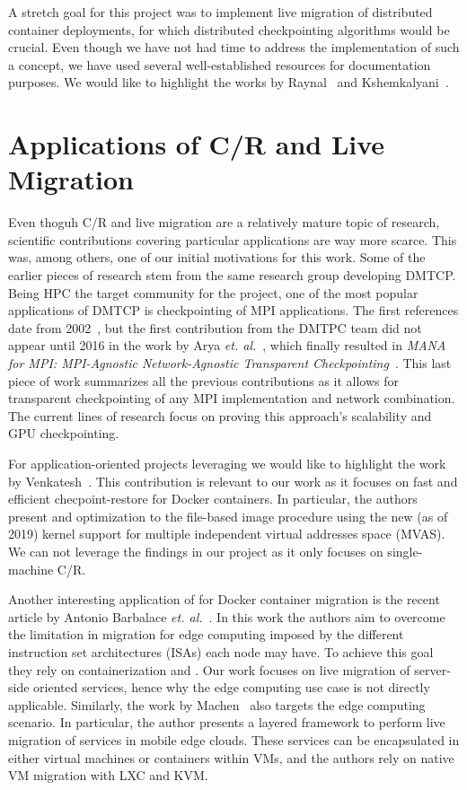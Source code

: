 A stretch goal for this project was to implement live migration of distributed container deployments, for which distributed checkpointing algorithms would be crucial.
Even though we have not had time to address the implementation of such a concept, we have used several well-established resources for documentation purposes.
We would like to highlight the works by Raynal~\cite{Raynal2013} and Kshemkalyani~\cite{Kshemkalyani2008}.

\section{Applications of C/R and Live Migration} \label{sec:rw-app}

Even thoguh C/R and live migration are a relatively mature topic of research, scientific contributions covering particular applications are way more scarce.
This was, among others, one of our initial motivations for this work.
Some of the earlier pieces of research stem from the same research group developing DMTCP.
Being HPC the target community for the project, one of the most popular applications of DMTCP is checkpointing of MPI applications.
The first references date from 2002~\cite{Bosilca2002}, but the first contribution from the DMTPC team did not appear until 2016 in the work by Arya \textit{et. al.}~\cite{Arya2016}, which finally resulted in \textit{MANA for MPI: MPI-Agnostic Network-Agnostic Transparent Checkpointing}~\cite{Garg2019}.
This last piece of work summarizes all the previous contributions as it allows for transparent checkpointing of any MPI implementation and network combination.
The current lines of research focus on proving this approach's scalability and GPU checkpointing.

For application-oriented projects leveraging \criu we would like to highlight the work by Venkatesh~\cite{Venkatesh2019}.
This contribution is relevant to our work as it focuses on fast and efficient checpoint-restore for Docker containers.
In particular, the authors present and optimization to the file-based image procedure using the new (as of 2019) kernel support for multiple independent virtual addresses space (MVAS).
We can not leverage the findings in our project as it only focuses on single-machine C/R.

Another interesting application of \criu for Docker container migration is the recent article by Antonio Barbalace \textit{et. al.}~\cite{Barbalace2020}.
In this work the authors aim to overcome the limitation in migration for edge computing imposed by the different instruction set architectures (ISAs) each node may have.
To achieve this goal they rely on containerization and \criu.
Our work focuses on live migration of server-side oriented services, hence why the edge computing use case is not directly applicable.
Similarly, the work by Machen~\cite{Machen2018} also targets the edge computing scenario.
In particular, the author presents a layered framework to perform live migration of services in mobile edge clouds.
These services can be encapsulated in either virtual machines or containers within VMs, and the authors rely on native VM migration with LXC and KVM.

